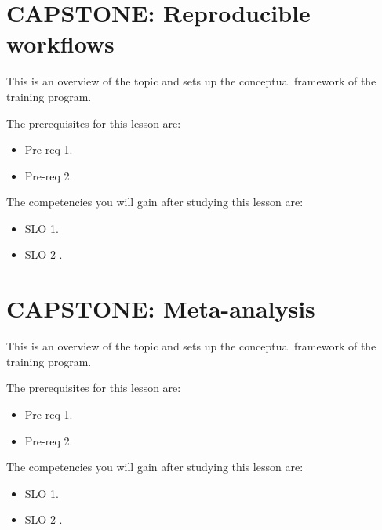\section{CAPSTONE: Reproducible workflows}
\label{sec:capstone-reproducible-workflows}

This is an overview of the topic and sets up the conceptual framework of the training program.




The prerequisites for this lesson are: 




\begin{itemize}
    \item Pre-req 1.
\end{itemize}

\begin{itemize}
    \item Pre-req 2.
\end{itemize}




The competencies you will gain after studying this lesson are: 




\begin{itemize}
    \item SLO 1.
\end{itemize}

\begin{itemize}
    \item SLO 2 .
\end{itemize}

\section{CAPSTONE: Meta-analysis}
\label{sec:capstone-meta-analysis}

This is an overview of the topic and sets up the conceptual framework of the training program.




The prerequisites for this lesson are: 




\begin{itemize}
    \item Pre-req 1.
\end{itemize}

\begin{itemize}
    \item Pre-req 2.
\end{itemize}




The competencies you will gain after studying this lesson are: 




\begin{itemize}
    \item SLO 1.
\end{itemize}

\begin{itemize}
    \item SLO 2 .
\end{itemize}
